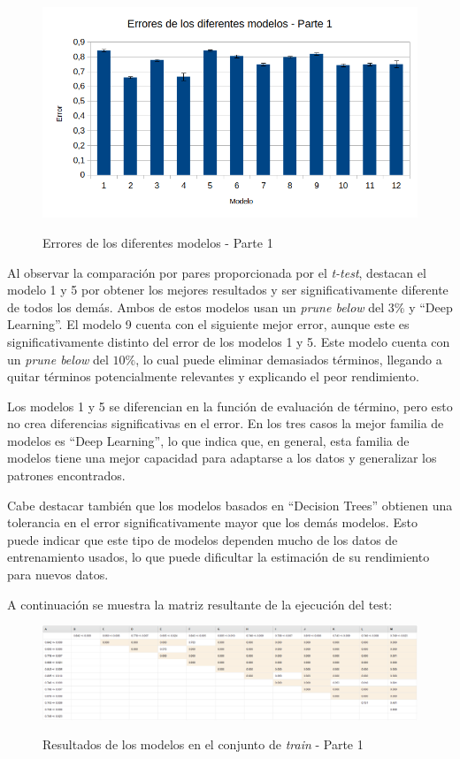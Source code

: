 \documentclass[es]{uc3mreport}
\begin{document}
\begin{report}
    \begin{figure}[H]
        \center
        \includegraphics[width=0.85\linewidth]{errors_train1.png}\\
        \caption{Errores de los diferentes modelos - Parte 1}
    \end{figure}

    Al observar la comparación por pares proporcionada por el \textit{t-test},
    destacan el modelo 1 y 5 por obtener los mejores resultados y ser significativamente
    diferente de todos los demás. Ambos de estos modelos usan un \textit{prune below}
    del $3\%$ y ``Deep Learning''. El modelo 9 cuenta con el siguiente mejor error,
    aunque este es significativamente distinto del error de los modelos 1 y 5. Este
    modelo cuenta con un \textit{prune below} del $10\%$, lo cual puede eliminar
    demasiados términos, llegando a quitar términos potencialmente relevantes y
    explicando el peor rendimiento.

    Los modelos 1 y 5 se diferencian en la función de evaluación de término, pero
    esto no crea diferencias significativas en el error. En los tres casos la mejor
    familia de modelos es ``Deep Learning'', lo que indica que, en general, esta
    familia de modelos tiene una mejor capacidad para adaptarse a los datos y
    generalizar los patrones encontrados.

    Cabe destacar también que los modelos basados en ``Decision Trees'' obtienen
    una tolerancia en el error significativamente mayor que los demás modelos.
    Esto puede indicar que este tipo de modelos dependen mucho de los datos de
    entrenamiento usados, lo que puede dificultar la estimación de su rendimiento
    para nuevos datos.

    A continuación se muestra la matriz resultante de la ejecución del test:

    \begin{figure}[H]
        \center
        \includegraphics[width=\linewidth]{t_test1.jpeg}\\
        \caption{Resultados de los modelos en el conjunto de \textit{train} - Parte 1}
    \end{figure}


\end{report}
\end{document}
